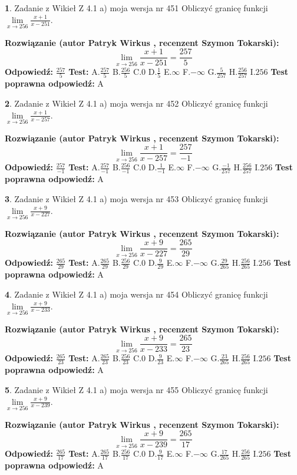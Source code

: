 \documentclass[12pt, a4paper]{article}
\theoremstyle{definition} %
\newtheorem{zad}{}
\newcommand{\zadStart}[1]{\begin{zad}#1\newline}
\newcommand{\zadStop}{\end{zad}}
\newcommand{\rozwStart}[2]{\noindent \textbf{Rozwiązanie (autor #1 , recenzent #2): }\newline}
\newcommand{\rozwStop}{\newline}
\newcommand{\odpStart}{\noindent \textbf{Odpowiedź:}\newline}
\newcommand{\odpStop}{\newline}
\newcommand{\testStart}{\noindent \textbf{Test:}\newline}
\newcommand{\testStop}{\newline}
\newcommand{\kluczStart}{\noindent \textbf{Test poprawna odpowiedź:}\newline}
\newcommand{\kluczStop}{\newline}
\begin{document}
\zadStart{Zadanie z Wikieł Z 4.1 a) moja wersja nr 451}
Obliczyć granicę funkcji $\lim\limits_{x\to256}\frac{x+1}{x-251}$.
\zadStop
\rozwStart{Patryk Wirkus}{Szymon Tokarski}
$$\lim\limits_{x\to256}\frac{x+1}{x-251} = \frac{257}{5}$$
\rozwStop
\odpStart
$\frac{257}{5}$
\odpStop
\testStart
A.$\frac{257}{5}$
B.$\frac{256}{5}$
C.$0$
D.$\frac{1}{5}$
E.$\infty$
F.$-\infty$
G.$\frac{5}{257}$
H.$\frac{256}{257}$
I.$256$
\testStop
\kluczStart
A
\kluczStop



\zadStart{Zadanie z Wikieł Z 4.1 a) moja wersja nr 452}
Obliczyć granicę funkcji $\lim\limits_{x\to256}\frac{x+1}{x-257}$.
\zadStop
\rozwStart{Patryk Wirkus}{Szymon Tokarski}
$$\lim\limits_{x\to256}\frac{x+1}{x-257} = \frac{257}{-1}$$
\rozwStop
\odpStart
$\frac{257}{-1}$
\odpStop
\testStart
A.$\frac{257}{-1}$
B.$\frac{256}{-1}$
C.$0$
D.$\frac{1}{-1}$
E.$\infty$
F.$-\infty$
G.$\frac{-1}{257}$
H.$\frac{256}{257}$
I.$256$
\testStop
\kluczStart
A
\kluczStop



\zadStart{Zadanie z Wikieł Z 4.1 a) moja wersja nr 453}
Obliczyć granicę funkcji $\lim\limits_{x\to256}\frac{x+9}{x-227}$.
\zadStop
\rozwStart{Patryk Wirkus}{Szymon Tokarski}
$$\lim\limits_{x\to256}\frac{x+9}{x-227} = \frac{265}{29}$$
\rozwStop
\odpStart
$\frac{265}{29}$
\odpStop
\testStart
A.$\frac{265}{29}$
B.$\frac{256}{29}$
C.$0$
D.$\frac{9}{29}$
E.$\infty$
F.$-\infty$
G.$\frac{29}{265}$
H.$\frac{256}{265}$
I.$256$
\testStop
\kluczStart
A
\kluczStop



\zadStart{Zadanie z Wikieł Z 4.1 a) moja wersja nr 454}
Obliczyć granicę funkcji $\lim\limits_{x\to256}\frac{x+9}{x-233}$.
\zadStop
\rozwStart{Patryk Wirkus}{Szymon Tokarski}
$$\lim\limits_{x\to256}\frac{x+9}{x-233} = \frac{265}{23}$$
\rozwStop
\odpStart
$\frac{265}{23}$
\odpStop
\testStart
A.$\frac{265}{23}$
B.$\frac{256}{23}$
C.$0$
D.$\frac{9}{23}$
E.$\infty$
F.$-\infty$
G.$\frac{23}{265}$
H.$\frac{256}{265}$
I.$256$
\testStop
\kluczStart
A
\kluczStop



\zadStart{Zadanie z Wikieł Z 4.1 a) moja wersja nr 455}
Obliczyć granicę funkcji $\lim\limits_{x\to256}\frac{x+9}{x-239}$.
\zadStop
\rozwStart{Patryk Wirkus}{Szymon Tokarski}
$$\lim\limits_{x\to256}\frac{x+9}{x-239} = \frac{265}{17}$$
\rozwStop
\odpStart
$\frac{265}{17}$
\odpStop
\testStart
A.$\frac{265}{17}$
B.$\frac{256}{17}$
C.$0$
D.$\frac{9}{17}$
E.$\infty$
F.$-\infty$
G.$\frac{17}{265}$
H.$\frac{256}{265}$
I.$256$
\testStop
\kluczStart
A
\kluczStop
\end{document}
